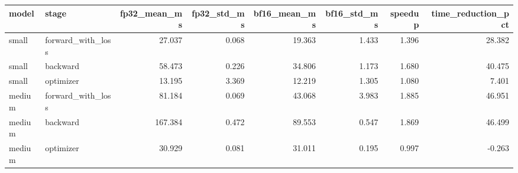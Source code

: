 \begin{tabular}{llrrrrrr}
\toprule
model & stage & fp32\_mean\_ms & fp32\_std\_ms & bf16\_mean\_ms & bf16\_std\_ms & speedup & time\_reduction\_pct \\
\midrule
small & forward\_with\_loss & 27.037 & 0.068 & 19.363 & 1.433 & 1.396 & 28.382 \\
small & backward & 58.473 & 0.226 & 34.806 & 1.173 & 1.680 & 40.475 \\
small & optimizer & 13.195 & 3.369 & 12.219 & 1.305 & 1.080 & 7.401 \\
medium & forward\_with\_loss & 81.184 & 0.069 & 43.068 & 3.983 & 1.885 & 46.951 \\
medium & backward & 167.384 & 0.472 & 89.553 & 0.547 & 1.869 & 46.499 \\
medium & optimizer & 30.929 & 0.081 & 31.011 & 0.195 & 0.997 & -0.263 \\
\bottomrule
\end{tabular}
